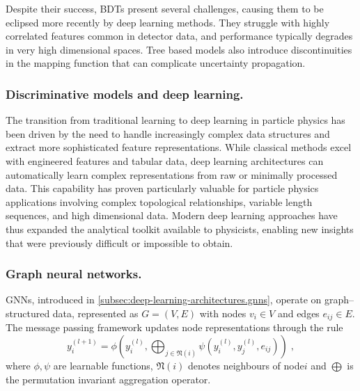             Despite their success, BDTs present several challenges, causing them to be eclipsed more recently by deep learning methods.
            They struggle with highly correlated features common in detector data, and performance typically degrades in very high dimensional spaces.
            Tree based models also introduce discontinuities in the mapping function that can complicate uncertainty propagation.
            
        \subsubsection{Discriminative models and deep learning.}
        
            The transition from traditional learning to deep learning in particle physics has been driven by the need to handle increasingly complex data structures and extract more sophisticated feature representations.
            While classical methods excel with engineered features and tabular data, deep learning architectures can automatically learn complex representations from raw or minimally processed data.
            This capability has proven particularly valuable for particle physics applications involving complex topological relationships, variable length sequences, and high dimensional data.
            Modern deep learning approaches have thus expanded the analytical toolkit available to physicists, enabling new insights that were previously difficult or impossible to obtain.
            
            \subsubsection{Graph neural networks.}
                GNNs, introduced in \cref{subsec:deep-learning-architectures.gnns}, operate on graph--structured data, represented as \(G = (V, E)\)
                with nodes \(v_i \in V\) and edges \(e_{ij} \in E\).
                The message passing framework updates node representations through the rule
                \begin{equation}
                    y_i^{(l+1)} = \phi\left(y_i^{(l)}, \bigoplus_{j \in \mathfrak{N}(i)} \psi(y_i^{(l)}, y_j^{(l)}, e_{ij})\right)\;,
                \end{equation}
                where \(\phi, \psi\) are learnable functions, \(\mathfrak{N}(i)\) denotes neighbours of node\(i\) and \(\bigoplus\) is the permutation invariant aggregation operator.
        
